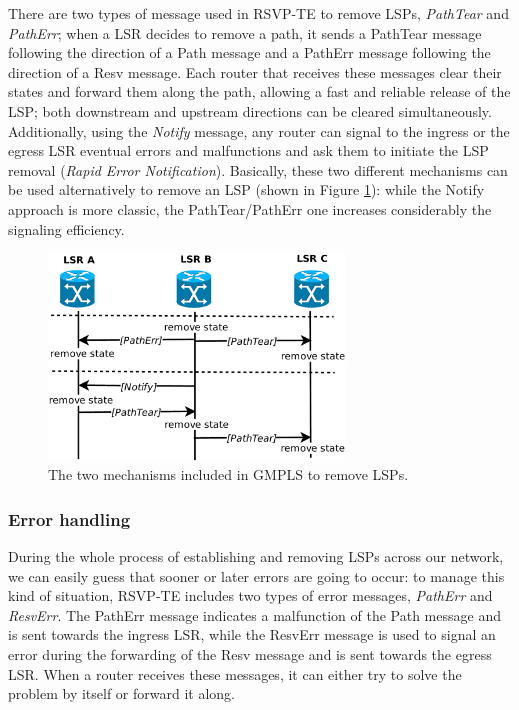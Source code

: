 \documentclass[10pt,a4paper]{report}
\begin{document}
There are two types of message used in RSVP-TE to remove LSPs,
\textit{PathTear} and \textit{PathErr}; when a LSR decides to remove a
path, it sends a PathTear message following the direction of a Path
message and a PathErr message following the direction of a Resv
message. Each router that receives these messages clear their states
and forward them along the path, allowing a fast and reliable release
of the LSP; both downstream and upstream directions can be cleared
simultaneously. Additionally, using the \textit{Notify} message, any
router can signal to the ingress or the egress LSR eventual errors and
malfunctions and ask them to initiate the LSP removal (\textit{Rapid
  Error Notification}). Basically, these two different mechanisms can
be used alternatively to remove an LSP (shown in Figure
\ref{fig:rsvp_tear}): while the Notify approach is more classic, the
PathTear/PathErr one increases considerably the signaling efficiency.

\begin{figure}[!htbp]
  \centering
  \includegraphics[width=0.7\textwidth]{img/rsvp_tear}
  \caption[RSVP-TE path removal]{The two mechanisms included in GMPLS
    to remove LSPs.}
  \label{fig:rsvp_tear}
\end{figure}

\subsubsection{Error handling}

During the whole process of establishing and removing LSPs across our
network, we can easily guess that sooner or later errors are going to
occur: to manage this kind of situation, RSVP-TE includes two types of
error messages, \textit{PathErr} and \textit{ResvErr}. The PathErr
message indicates a malfunction of the Path message and is sent
towards the ingress LSR, while the ResvErr message is used to signal
an error during the forwarding of the Resv message and is sent towards
the egress LSR. When a router receives these messages, it can either
try to solve the problem by itself or forward it along.
\end{document}

